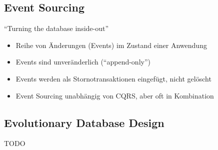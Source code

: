\documentclass[a4paper, landscape, 8pt]{scrartcl}
\begin{document}
\begin{multicols*}{4}
        \subsection{Event Sourcing}
        \enquote{Turning the database inside-out}
        \begin{itemize}
            \item Reihe von Änderungen (Events) im Zustand einer Anwendung
            \item Events sind unveränderlich (\enquote{append-only})
            \item Events werden als Stornotransaktionen eingefügt, nicht gelöscht
            \item Event Sourcing unabhängig von CQRS, aber oft in Kombination
        \end{itemize}

        \subsection{Evolutionary Database Design}
        TODO

    \end{multicols*}
\end{document}
